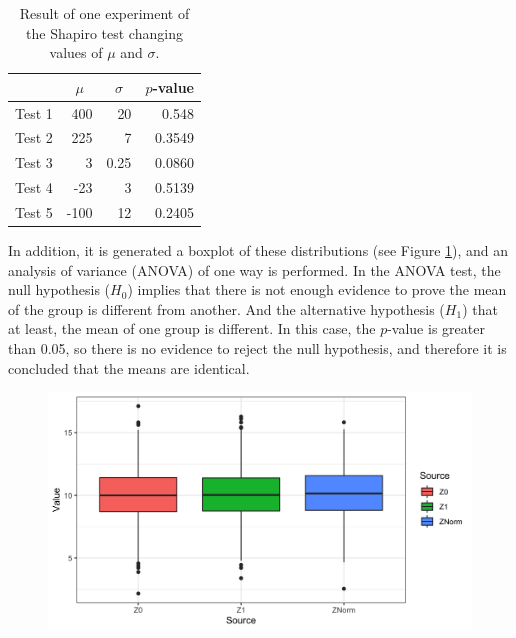 \documentclass[10pt,leter,openany]{article}
\begin{document}
		
		\begin{table}[]
			\centering
			\caption{Result of one experiment of the Shapiro test changing values of $\mu$ and $\sigma$.}
			\label{tab:gaussian_mu_sigma}
			\begin{tabular}{lrrr}
				\hline
				& \multicolumn{1}{c}{$\mu$} & \multicolumn{1}{c}{$\sigma$} & \multicolumn{1}{c}{$p$-value} \\ \hline
				Test 1  & 400                       & 20                           & 0.548                         \\
				Test 2 & 225                       & 7                            & 0.3549                        \\
				Test 3 & 3                         & 0.25                         & 0.0860                        \\
				Test 4 & -23                       & 3                            & 0.5139                        \\
				Test 5 & -100                      & 12                           & 0.2405                        \\ \hline
			\end{tabular}
		\end{table}
	
	
		In addition, it is generated a boxplot of these distributions (see Figure \ref{fig:box1}), and an analysis of variance (ANOVA) of one way is performed. In the ANOVA test, the null hypothesis ($ H_{0} $)  implies that there is not enough evidence to prove the mean of the group is different from another. And the alternative hypothesis ($ H_{1} $) that at least, the mean of one group is different. In this case, the $p$-value is greater than 0.05, so there is no evidence to reject the null hypothesis, and therefore it is concluded that the means are identical.
 
			\begin{figure}
				\begin{center}
					\includegraphics[scale=0.29]{extras/boxplot1}
					\label{fig:box1}
				\end{center}
			\end{figure}
\end{document}
